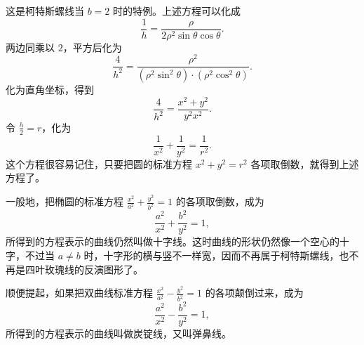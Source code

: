 \medskip
\noindent
这是柯特斯螺线当 $b=2$ 时的特例。上述方程可以化成
\[
  \frac{1}{h} = \frac{\rho}{2\rho^2\sin\theta\cos\theta}.
\]
两边同乘以 $2$，平方后化为
\[
  \frac{4}{h^2} = \frac{\rho^2}{(\rho^2\sin^2\theta)\cdot(\rho^2\cos^2\theta)}.
\]
化为直角坐标，得到
\[
  \frac{4}{h^2} = \frac{x^2+y^2}{y^2 x^2}.
\]
令 $\frac{h}{2} = r$，化为
\[
  \frac{1}{x^2} + \frac{1}{y^2} = \frac{1}{r^2}.
\]
这个方程很容易记住，只要把圆的标准方程 $x^2+y^2=r^2$ 各项取倒数，就得到上述方程了。

一般地，把椭圆的标准方程 $\frac{x^2}{a^2} + \frac{y^2}{b^2} = 1$ 的各项取倒数，成为
\[
  \frac{a^2}{x^2} + \frac{b^2}{y^2} = 1,
\]
所得到的方程表示的曲线仍然叫做十字线。这时曲线的形状仍然像一个空心的十字，不过当 $a\neq b$ 时，十字形的横与竖不一样宽，因而不再属于柯特斯螺线，也不再是四叶玫瑰线的反演图形了。

顺便提起，如果把双曲线标准方程 $\frac{x^2}{a^2} - \frac{y^2}{b^2} = 1$ 的各项颠倒过来，成为
\[
  \frac{a^2}{x^2} - \frac{b^2}{y^2} = 1,
\]
所得到的方程表示的曲线叫做炭锭线，又叫弹鼻线。
